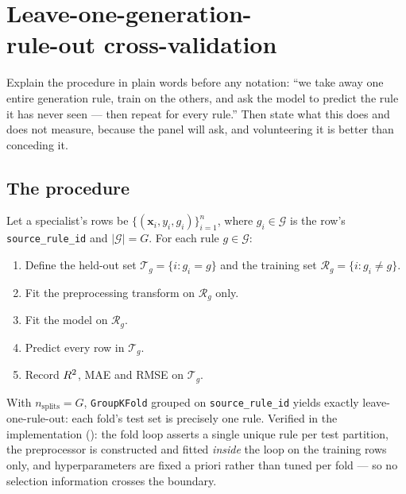 \chapter[Leave-one-generation-rule-out cross-validation]{Leave-one-generation-\\rule-out cross-validation}
\label{ch:loro}

\begin{saybox}[title=What to say at the start of this section]
Explain the procedure in plain words before any notation: ``we take away
one entire generation rule, train on the others, and ask the model to
predict the rule it has never seen --- then repeat for every rule.'' Then
state what this does and does not measure, because the panel will ask, and
volunteering it is better than conceding it.
\end{saybox}

\section{The procedure}

Let a specialist's rows be $\{(\mathbf{x}_i, y_i, g_i)\}_{i=1}^{n}$, where
$g_i \in \mathcal{G}$ is the row's \texttt{source\_rule\_id} and
$|\mathcal{G}| = G$. For each rule $g \in \mathcal{G}$:

\begin{enumerate}[leftmargin=1.5em, itemsep=1pt]
\item Define the held-out set $\mathcal{T}_g = \{ i : g_i = g \}$ and the
  training set $\mathcal{R}_g = \{ i : g_i \neq g \}$.
\item Fit the preprocessing transform on $\mathcal{R}_g$ only.
\item Fit the model on $\mathcal{R}_g$.
\item Predict every row in $\mathcal{T}_g$.
\item Record $R^2$, MAE and RMSE on $\mathcal{T}_g$.
\end{enumerate}

With $n_{\text{splits}} = G$, \texttt{GroupKFold} grouped on
\texttt{source\_rule\_id} yields exactly leave-one-rule-out: each fold's
test set is precisely one rule. Verified in the implementation
(): the fold loop
asserts a single unique rule per test partition, the preprocessor is
constructed and fitted \emph{inside} the loop on the training rows only,
and hyperparameters are fixed a priori rather than tuned per fold --- so
no selection information crosses the boundary.

